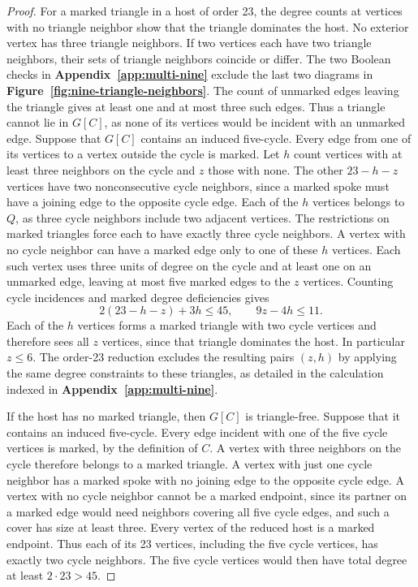 \begin{proof}
For a marked triangle in a host of order 23, the degree counts at
vertices with no triangle neighbor show that the triangle dominates
the host. No exterior vertex has three triangle neighbors. If two
vertices each have two triangle neighbors, their sets of triangle
neighbors coincide or differ. The two Boolean checks
in \textbf{Appendix~\ref{app:multi-nine}} exclude the last two diagrams
in \textbf{Figure~\ref{fig:nine-triangle-neighbors}}.
The count of unmarked edges leaving the triangle gives at least one
and at most three such edges. Thus a triangle cannot lie in $G[C]$,
as none of its vertices would be incident with an unmarked edge.
Suppose that $G[C]$ contains an induced five-cycle. Every edge from
one of its vertices to a vertex outside the cycle is marked. Let $h$
count vertices with at least three neighbors on the cycle and $z$
those with none. The other $23-h-z$ vertices have two nonconsecutive
cycle neighbors, since a marked spoke must have a joining edge to
the opposite cycle edge. Each of the $h$ vertices belongs to $Q$,
as three cycle neighbors include two adjacent vertices. The
restrictions on marked triangles force each to have exactly three
cycle neighbors. A vertex with no cycle neighbor can have a marked
edge only to one of these $h$ vertices. Each such vertex uses three
units of degree on the cycle and at least one on an unmarked edge,
leaving at most five marked edges to the $z$ vertices. Counting
cycle incidences and marked degree deficiencies gives
\[
  2(23-h-z)+3h\leq45,\qquad 9z-4h\leq11 .
\]
Each of the $h$ vertices forms a marked triangle with two cycle
vertices and therefore sees all $z$ vertices, since that triangle
dominates the host. In particular $z\leq6$. The order-23 reduction
excludes the resulting pairs $(z,h)$ by applying the same degree
constraints to these triangles, as detailed in the calculation
indexed in \textbf{Appendix~\ref{app:multi-nine}}.

If the host has no marked triangle, then $G[C]$ is triangle-free.
Suppose that it contains an induced five-cycle. Every edge incident
with one of the five cycle vertices is marked, by the definition of
$C$. A vertex with three neighbors on the cycle therefore belongs to
a marked triangle. A vertex with just one cycle neighbor has a marked
spoke with no joining edge to the opposite cycle edge. A vertex with
no cycle neighbor cannot be a marked endpoint, since its partner on
a marked edge would need neighbors covering all five cycle edges,
and such a cover has size at least three. Every vertex of the reduced
host is a marked endpoint. Thus each of its 23 vertices, including
the five cycle vertices, has exactly two cycle neighbors. The five
cycle vertices would then have total degree at least $2\cdot23>45$.


\end{proof}
